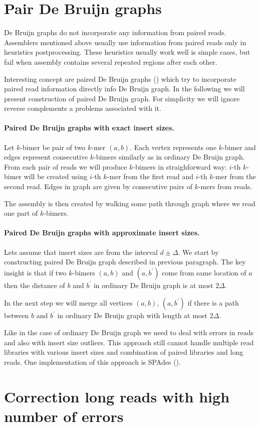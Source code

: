 \section{Pair De Bruijn graphs}

De Bruijn graphs do not incorporate any information from paired reads.
Assemblers mentioned above usually use information from paired reads only in heuristics postprocessing.
These heuristics usually work well is simple cases, but fail when assembly contains several repeated regions after each other.

Interesting concept are paired De Bruijn graphs (\cite{Paired}) which try to incorporate paired read
information directly info De Bruijn graph. In the following we will present construction of 
paired De Bruijn graph. For simplicity we will ignore reverse complements a problems associated with it.

\paragraph{Paired De Bruijn graphs with exact insert sizes.}
Let $k$-bimer be pair of two $k$-mer $(a, b)$. Each vertex represents one $k$-bimer and edges represent
consecutive $k$-bimers similarly as in ordinary De Bruijn graph. 
From each pair of reads we will produce $k$-bimers in straighforward way:
$i$-th $k$-bimer will be created using $i$-th $k$-mer from the first read and $i$-th $k$-mer from the second read.
Edges in graph are given by consecutive pairs of $k$-mers from reads.

The assembly is then created by walking some path through graph where we read one part of $k$-bimers.

\paragraph{Paired De Bruijn graphs with approximate insert sizes.}
Lets assume that insert sizes are from the interval $d \pm \Delta$.
We start by constructing paired De Bruijn graph described in previous paragraph.
The key insight is that if two $k$-bimers $(a, b)$ and $(a, b^{'})$ come from
same location of $a$ then the distance of $b$ and $b^{'}$ in ordinary De Bruijn graph is at most $2\Delta$.

In the next step we will merge all vertices $(a, b)$, $(a, b^{'})$ if there is a path
between $b$ and $b^{'}$ in ordinary De Bruijn graph with length at most $2\Delta$.

\bigskip
Like in the case of ordinary De Bruijn graph we need to deal with errors in reads
and also with insert size outliers. This approach still cannot handle multiple
read libraries with various insert sizes and combination of paired libraries and long reads.
One implementation of this approach is SPAdes (\cite{Spades}).



\section{Correction long reads with high number of errors}
